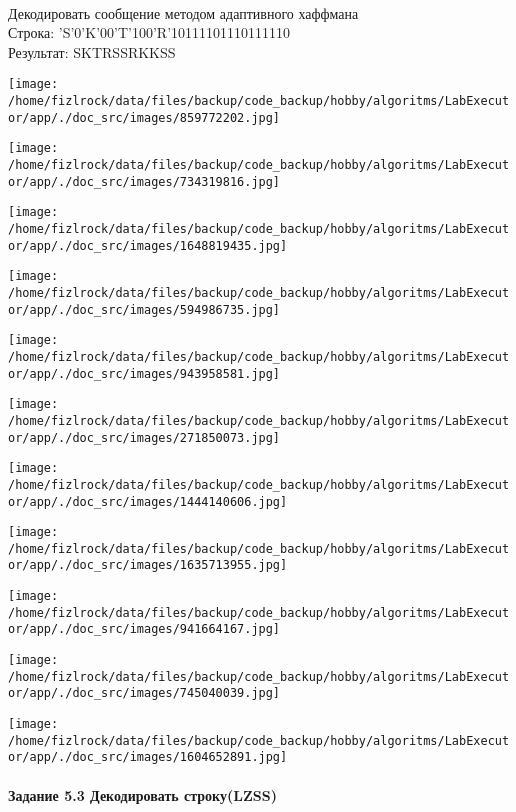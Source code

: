 \documentclass[a4paper, 12pt]{article}
\begin{document}
\\ 

Декодировать сообщение методом адаптивного хаффмана \\
Строка: 
'S'0'K'00'T'100'R'10111101110111110\\
Результат: SKTRSSRKKSS

\texttt{[image: /home/fizlrock/data/files/backup/code\_backup/hobby/algoritms/LabExecutor/app/./doc\_src/images/859772202.jpg]}

\texttt{[image: /home/fizlrock/data/files/backup/code\_backup/hobby/algoritms/LabExecutor/app/./doc\_src/images/734319816.jpg]}

\texttt{[image: /home/fizlrock/data/files/backup/code\_backup/hobby/algoritms/LabExecutor/app/./doc\_src/images/1648819435.jpg]}

\texttt{[image: /home/fizlrock/data/files/backup/code\_backup/hobby/algoritms/LabExecutor/app/./doc\_src/images/594986735.jpg]}

\texttt{[image: /home/fizlrock/data/files/backup/code\_backup/hobby/algoritms/LabExecutor/app/./doc\_src/images/943958581.jpg]}

\texttt{[image: /home/fizlrock/data/files/backup/code\_backup/hobby/algoritms/LabExecutor/app/./doc\_src/images/271850073.jpg]}

\texttt{[image: /home/fizlrock/data/files/backup/code\_backup/hobby/algoritms/LabExecutor/app/./doc\_src/images/1444140606.jpg]}

\texttt{[image: /home/fizlrock/data/files/backup/code\_backup/hobby/algoritms/LabExecutor/app/./doc\_src/images/1635713955.jpg]}

\texttt{[image: /home/fizlrock/data/files/backup/code\_backup/hobby/algoritms/LabExecutor/app/./doc\_src/images/941664167.jpg]}

\texttt{[image: /home/fizlrock/data/files/backup/code\_backup/hobby/algoritms/LabExecutor/app/./doc\_src/images/745040039.jpg]}

\texttt{[image: /home/fizlrock/data/files/backup/code\_backup/hobby/algoritms/LabExecutor/app/./doc\_src/images/1604652891.jpg]}
\pagebreak
\paragraph{Задание 5.3 Декодировать строку(LZSS)\\}
\end{document}
